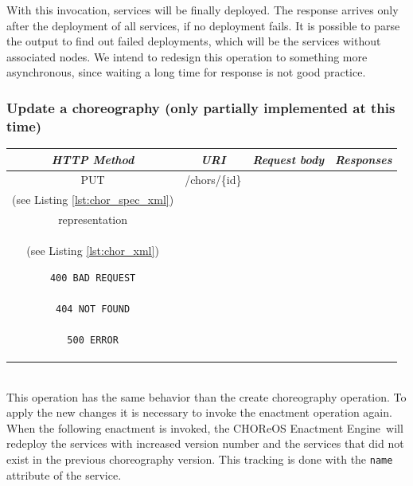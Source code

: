 \documentclass[a4paper, 10pt]{article}
\newcommand{\ee}{CHOReOS Enactment Engine}
\begin{document}
With this invocation, services will be finally deployed.
The response arrives only after the deployment of all services, if no deployment fails.
It is possible to parse the output to find out failed deployments, which will be the services without associated nodes.
We intend to redesign this operation to something more asynchronous, since waiting a long time for response is not good practice.

\subsubsection*{Update a choreography (only partially implemented at this time)}

\begin{tabular}{|c|c|c|c|}
\hline 
\itshape{HTTP Method} & \itshape{URI} & \itshape{Request body} & \itshape{Responses} \\ 
\hline 
PUT & /chors/\{id\} & 

\begin{minipage}{2in}
\verb!ChorSpec! XML representation \\ 
(see Listing \ref{lst:chor_spec_xml})
\end{minipage} 
&
\begin{minipage}{2in}
\begin{verbatim}

200 OK
location = "/chors/{id}"
Body: 
\end{verbatim}
\verb!Choreography! XML \\
representation \\
(see Listing \ref{lst:chor_xml})
\begin{verbatim}
400 BAD REQUEST

404 NOT FOUND

500 ERROR

\end{verbatim}
\end{minipage} 
\\ 
\hline 
\end{tabular} \\

This operation has the same behavior than the create choreography operation.
To apply the new changes it is necessary to invoke the enactment operation again.
When the following enactment is invoked, the \ee\ will redeploy the services with increased version number and the services that did not exist in the previous choreography version. This tracking is done with the \texttt{name} attribute of the service.
\end{document}
